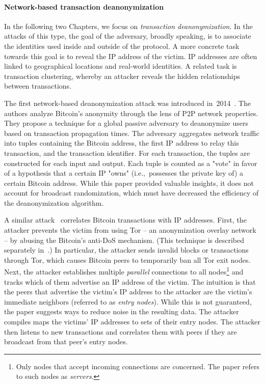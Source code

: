 \paragraph{Network-based transaction deanonymization}

In the following two Chapters, we focus on \textit{transaction deanonymization}.
In the attacks of this type, the goal of the adversary, broadly speaking, is to associate the identities used inside and outside of the protocol.
A more concrete task towards this goal is to reveal the IP address of the victim.
IP addresses are often linked to geographical locations and real-world identities.
A related task is transaction clustering, whereby an attacker reveals the hidden relationships between transactions.

The first network-based deanonymization attack was introduced in~2014~\cite{Koshy2014}.
The authors analyze Bitcoin's anonymity through the lens of P2P network properties.
They propose a technique for a global passive adversary to deanonymize users based on transaction propagation times.
The adversary aggregates network traffic into tuples containing the Bitcoin address, the first IP address to relay this transaction, and the transaction identifier.
For each transaction, the tuples are constructed for each input and output.
Each tuple is counted as a "vote" in favor of a hypothesis that a certain IP "owns" (i.e.,~possesses the private key of) a certain Bitcoin address.
While this paper provided valuable insights, it does not account for broadcast randomization, which must have decreased the efficiency of the deanonymization algorithm.

A similar attack~\cite{Biryukov2014} correlates Bitcoin transactions with IP addresses.
First, the attacker  prevents the victim from using Tor -- an anonymization overlay network -- by abusing the Bitcoin's anti-DoS mechanism.
(This technique is described separately in~\cite{Biryukov2015}.)
In particular, the attacker sends invalid blocks or transactions through Tor, which causes Bitcoin peers to temporarily ban all Tor exit nodes.
Next, the attacker establishes multiple \textit{parallel} connections to all nodes\footnote{Only nodes that accept incoming connections are concerned. The paper refers to such nodes as \textit{servers}.} and tracks which of them advertise an IP address of the victim.
The intuition is that the peers that advertise the victim's IP address to the attacker are the victim's immediate neighbors (referred to as \textit{entry nodes}).
While this is not guaranteed, the paper suggests ways to reduce noise in the resulting data.
The attacker compiles maps the victims' IP addresses to sets of their entry nodes.
The attacker then listens to new transactions and correlates them with peers if they are broadcast from that peer's entry nodes.

